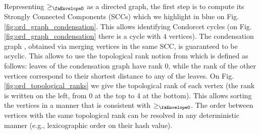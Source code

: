 Representing $\geq_{\text{\faEnvelopeO}}$ as a directed graph, the first step is to compute its Strongly Connected Components (SCCs) which we highlight in blue on Fig.\ref{fig:ord_graph_condensation}.
This allows identifying Condorcet cycles (on Fig.\ref{fig:ord_graph_condensation} there is a cycle with $4$ vertices).
The condensation graph \cite{order_fairness_for_byzantine_consensus,themis_fast_strong_order_fairness_in_byzantine_consensus}, obtained via merging vertices in the same SCC, is guaranteed to be acyclic.
This allows to use the topological rank notion from \cite{diversified_top_k_graph_pattern_matching} which is defined as follows:
leaves of the condensation graph have rank 0, while the rank of the other vertices correspond to their shortest distance to any of the leaves.
On Fig.\ref{fig:ord_topological_ranks} we give the topological rank of each vertex (the rank is written on the left, from 0 at the top to 4 at the bottom). 
This allows sorting the vertices in a manner that is consistent with $\geq_{\text{\faEnvelopeO}}$.
The order between vertices with the same topological rank can be resolved in any deterministic manner (e.g., lexicographic order on their hash value).